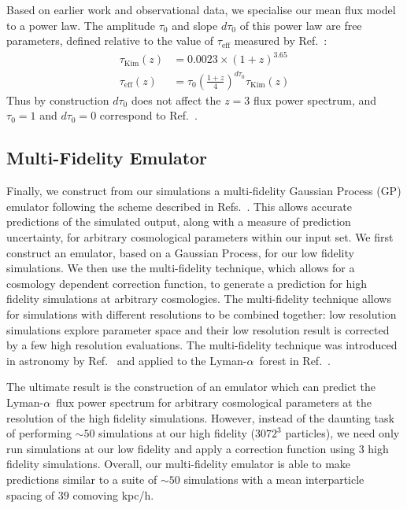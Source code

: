 \documentclass[a4paper,11pt]{article}
\newcommand{\Lya}{Lyman-$\alpha$}
\begin{document}
Based on earlier work and observational data, we specialise our mean flux model to a power law. The amplitude $\tau_0$ and slope $d\tau_0$ of this power law are free parameters, defined relative to the value of $\tau_\mathrm{eff}$ measured by Ref.~\cite{Kim:2007}:
\begin{align}
\tau_\mathrm{Kim}(z) &= 0.0023 \times (1 + z)^{3.65} \\
 \tau_\mathrm{eff}(z) &= \tau_0 \left(\frac{1+z}{4}\right)^{d\tau_0}  \tau_\mathrm{Kim}(z)
 \label{eq:meanflux}
\end{align}
Thus by construction $d\tau_0$ does not affect the $z=3$ flux power spectrum, and $\tau_0 = 1$ and $d\tau_0 = 0$ correspond to Ref.~\cite{Kim:2007}.


\subsection{Multi-Fidelity Emulator}

Finally, we construct from our simulations a multi-fidelity Gaussian Process (GP) emulator following the scheme described in Refs.~\cite{Bird:2019, Fernandez:2022}.
This allows accurate predictions of the simulated output, along with a measure of prediction uncertainty, for arbitrary cosmological parameters within our input set. We first construct an emulator, based on a Gaussian Process, for our low fidelity simulations. We then use the multi-fidelity technique, which allows for a cosmology dependent correction function, to generate a prediction for high fidelity simulations at arbitrary cosmologies.
The multi-fidelity technique allows for simulations with different resolutions to be combined together: low resolution simulations explore parameter space and their low resolution result is corrected by a few high resolution evaluations. The multi-fidelity technique was introduced in astronomy by Ref.~\cite{Ho:2022} and applied to the \Lya~forest in Ref.~\cite{Fernandez:2022}.

The ultimate result is the construction of an emulator which can predict the \Lya~flux power spectrum for arbitrary cosmological parameters at the resolution of the high fidelity simulations. However, instead of the daunting task of performing $\sim 50$ simulations at our high fidelity ($3072^3$ particles), we need only run simulations at our low fidelity and apply a correction function using $3$ high fidelity simulations. Overall, our multi-fidelity emulator is able to make predictions similar to a suite of $\sim 50$ simulations with a mean interparticle spacing of $39$ comoving kpc/h.
\end{document}
